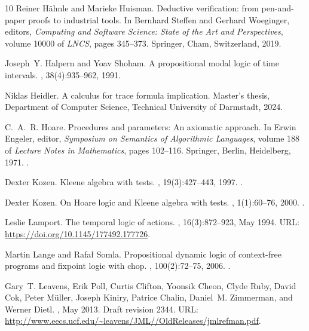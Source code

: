 \documentclass[10pt,a4paper]{amsart}
\theoremstyle{definition}
\begin{document}
\begin{thebibliography}{10}
Reiner H{\"a}hnle and Marieke Huisman.
\newblock Deductive verification: from pen-and-paper proofs to industrial
  tools.
\newblock In Bernhard Steffen and Gerhard Woeginger, editors, {\em Computing
  and Software Science: State of the Art and Perspectives}, volume 10000 of
  {\em LNCS}, pages 345--373. Springer, Cham, Switzerland, 2019.

Joseph~Y. Halpern and Yoav Shoham.
\newblock A propositional modal logic of time intervals.
, 38(4):935--962, 1991.

Niklas Heidler.
\newblock A calculus for trace formula implication.
\newblock Master's thesis, Department of Computer Science, Technical University
  of Darmstadt, 2024.

C.~A.~R. Hoare.
\newblock Procedures and parameters: An axiomatic approach.
\newblock In Erwin Engeler, editor, {\em Symposium on Semantics of Algorithmic
  Languages}, volume 188 of {\em Lecture Notes in Mathematics}, pages 102--116.
  Springer, Berlin, Heidelberg, 1971.
\newblock \href {https://doi.org/10.1007/BFb0059696}
  {}.

Dexter Kozen.
\newblock Kleene algebra with tests.
,
  19(3):427--443, 1997.
\newblock \href {https://doi.org/10.1145/256167.256195}
  {}.

Dexter Kozen.
\newblock On {Hoare} logic and {Kleene} algebra with tests.
, 1(1):60--76, 2000.
\newblock \href {https://doi.org/10.1145/343369.343378}
  {}.

Leslie Lamport.
\newblock The temporal logic of actions.
, 16(3):872–923, May 1994.
\newblock URL: \url{https://doi.org/10.1145/177492.177726}.

Martin Lange and Rafa{\l} Somla.
\newblock Propositional dynamic logic of context-free programs and fixpoint
  logic with chop.
, 100(2):72--75, 2006.
\newblock \href {https://doi.org/10.1016/J.IPL.2006.04.019}
  {}.

Gary~T. Leavens, Erik Poll, Curtis Clifton, Yoonsik Cheon, Clyde Ruby, David
  Cok, Peter M\"{u}ller, Joseph Kiniry, Patrice Chalin, Daniel~M. Zimmerman,
  and Werner Dietl.
, May 2013.
\newblock Draft revision 2344.
\newblock URL:
  \url{http://www.eecs.ucf.edu/~leavens/JML//OldReleases/jmlrefman.pdf}.


\end{thebibliography}
\end{document}
